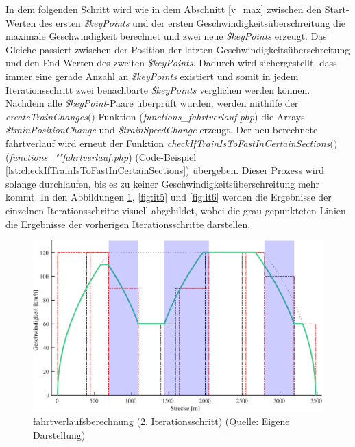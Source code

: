 In dem fol\-gen\-den Schritt wird wie in dem Abschnitt \ref{v_max} zwischen den Start-Werten des ersten \textit{\$keyPoints} und der ersten Geschwindigkeitsüberschreitung die maximale Geschwindigkeit berechnet und zwei neue \textit{\$keyPoints} erzeugt. Das Gleiche passiert zwischen der Position der letzten Geschwindigkeitsüberschreitung und den End-Werten des zweiten \textit{\$keyPoints}. Dadurch wird sichergestellt, dass immer eine gerade Anzahl an \textit{\$keyPoints} existiert und somit in jedem Iterationsschritt zwei benachbarte \textit{\$keyPoints} verglichen werden können. Nachdem alle \textit{\$keyPoint}-Paare überprüft wurden, werden mithilfe der \textit{create\-Train\-Changes$($$)$}-Funktion (\textit{functions\_fahrtverlauf.php}) die Arrays \textit{\$train\-Position\-Change} und \textit{\$train\-Speed\-Change} erzeugt. Der neu berechnete \Gls{fahrtverlauf} wird erneut der Funktion \textit{check\-If\-Train\-Is\-To\-Fast\-In\-Certain\-Sections$($$)$} (\textit{func\-tions\_""fahrt\-ver\-lauf\-.php}) (Code-Bei\-spiel \ref{lst:checkIfTrainIsToFastInCertainSections}) übergeben. Dieser Prozess wird solange durchlaufen, bis es zu keiner Geschwindigkeitsüberschreitung mehr kommt. In den Abbildungen \ref{fig:it4}, \ref{fig:it5} und \ref{fig:it6} werden die Ergebnisse der einzelnen Iterationsschritte visuell abgebildet, wobei die grau gepunkteten Linien die Ergebnisse der vorherigen Iterationsschritte darstellen.
\begin{figure}
\includegraphics[width=\linewidth]{../images/matlab/it4.pdf}
\caption[\Gls{fahrtverlauf}sberechnung (2. Iterationsschritt)]{\Gls{fahrtverlauf}sberechnung (2. Iterationsschritt) (Quelle: Eigene Darstellung)}
\label{fig:it4}
\end{figure}
